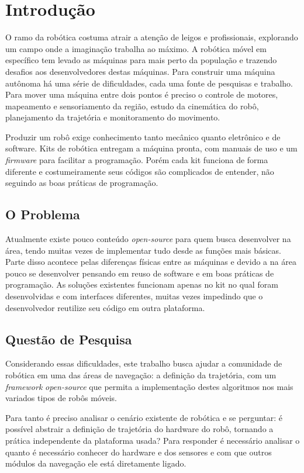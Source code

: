 
\chapter[Introdução]{Introdução}

O ramo da robótica costuma atrair a atenção de leigos e profissionais, explorando um campo onde a imaginação trabalha ao máximo. A robótica móvel em específico tem levado as máquinas para mais perto da população e trazendo desafios aos desenvolvedores destas máquinas. Para construir uma máquina autônoma há uma série de dificuldades, cada uma fonte de pesquisas e trabalho. Para mover uma máquina entre dois pontos é preciso o controle de motores, mapeamento e sensoriamento da região, estudo da cinemática do robô, planejamento da trajetória e monitoramento do movimento.

Produzir um robô exige conhecimento tanto mecânico quanto eletrônico e de software. Kits de robótica entregam a máquina pronta, com manuais de uso e um \textit{firmware} para facilitar a programação. Porém cada kit funciona de forma diferente e costumeiramente seus códigos são complicados de entender, não seguindo as boas práticas de programação.

\section{O Problema}

Atualmente existe pouco conteúdo \textit{open-source} para quem busca desenvolver na área, tendo muitas vezes de implementar tudo desde as funções mais básicas. Parte disso acontece pelas diferenças físicas entre as máquinas e devido a na área pouco se desenvolver pensando em reuso de software e em boas práticas de programação. As soluções existentes funcionam apenas no kit no qual foram desenvolvidas e com interfaces diferentes, muitas vezes impedindo que o desenvolvedor reutilize seu código em outra plataforma.

\section{Questão de Pesquisa}

Considerando essas dificuldades, este trabalho busca ajudar a comunidade de robótica em uma das áreas de navegação: a definição da trajetória, com um \textit{framework} \textit{open-source} que permita a implementação destes algoritmos nos mais variados tipos de robôs móveis.

Para tanto é preciso analisar o cenário existente de robótica e se perguntar: é possível abstrair a definição de trajetória do hardware do robô, tornando a prática independente da plataforma usada? Para responder é necessário analisar o quanto é necessário conhecer do hardware e dos sensores e com que outros módulos da navegação ele está diretamente ligado.

